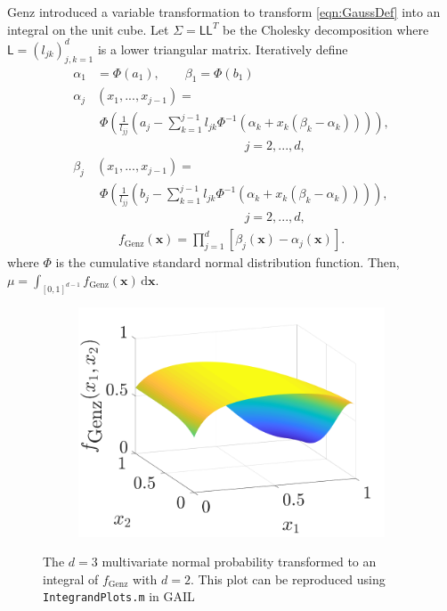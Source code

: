 \documentclass[twocolumn]{svjour3}          %
\newcommand{\bm}[1]{\boldsymbol{#1}}
\newcommand{\mSigma}{\mathsf{\Sigma}}
\newcommand{\dif}[1]{\text{d}{#1}}
\newcommand{\vx}{\bm{x}}
\newcommand{\dvx}{\dif{\bm{x}}}
\newcommand{\mL}{\mathsf{L}}
\newcommand{\code}[1]{\texttt{#1}}
\begin{document}
Genz \cite{Gen93} introduced a variable transformation to transform \eqref{eqn:GaussDef} into an integral on the unit cube.  Let $\mSigma= \mL \mL^T$ be the Cholesky decomposition where $\mL = (l_{jk})_{j,k=1}^d$ is a lower triangular matrix.  Iteratively define
\begin{align*}
\alpha_1& = \Phi(a_1), \qquad \beta_1 = \Phi(b_1)
\\
\alpha_j&(x_1,...,x_{j-1}) = 
\\
&\; \Phi
\left(
\frac{1}{l_{jj}} 
\left(
a_j - \sum_{k=1}^{j-1} l_{jk} \Phi^{-1}(\alpha_k + x_k(\beta_k-\alpha_k))
\right)
\right), 
\\
&\hspace{5cm} j=2,...,d,
\\
\beta_j&(x_1,...,x_{j-1}) = 
\\
&\; \Phi
\left(
\frac{1}{l_{jj}} 
\left(
b_j - \sum_{k=1}^{j-1} l_{jk} \Phi^{-1}(\alpha_k + x_k(\beta_k-\alpha_k))
\right)
\right), 
\\
&\hspace{5cm} j=2,...,d,
\end{align*}
\begin{align}
\label{fGenzdef}
f_{\text{Genz}}(\vx) = \prod_{j=1}^d [\beta_j(\vx) - \alpha_j(\vx)].
\end{align}
where $\Phi$ is the cumulative standard normal distribution function.  Then, $\mu = \int_{[0,1]^{d-1}} f_{\text{Genz}}(\vx) \, \dvx$.

\begin{figure}
	\captionsetup[subfigure]{labelformat=empty}
	\centering
	\begin{subfigure}[h]{0.48\linewidth}
		\includegraphics[width=1.1\linewidth]{GenzFunc_varTx_none}
	\end{subfigure}
	\caption{The $d=3$ multivariate normal probability transformed to an integral of $f_{\text{Genz}}$ with  $d=2$. This plot can be reproduced using \code{IntegrandPlots.m} in GAIL}
	\label{fig:MVN_Genz}
\end{figure}
\end{document}
